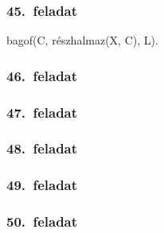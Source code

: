 \subsubsection*{45.~feladat}
\begin{program}
bagof(C, részhalmaz(X, C), L).
\end{program}
\subsubsection*{46.~feladat}
\begin{program}

\end{program}
\subsubsection*{47.~feladat}
\begin{program}

\end{program}
\subsubsection*{48.~feladat}
\begin{program}

\end{program}
\subsubsection*{49.~feladat}
\begin{program}

\end{program}
\subsubsection*{50.~feladat}
\begin{program}

\end{program}
